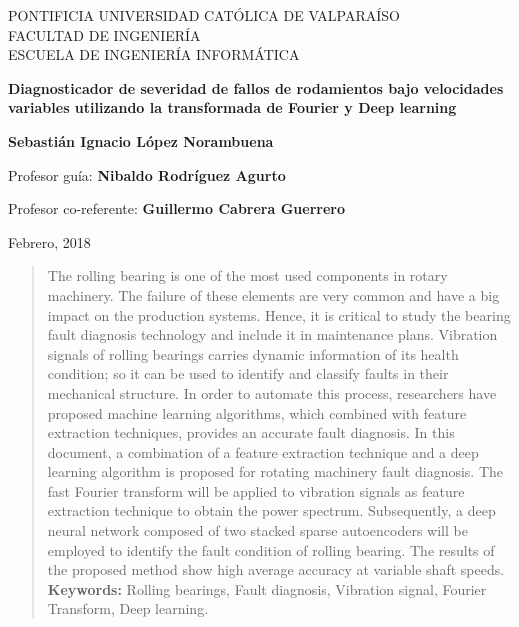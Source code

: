 \documentclass[12pt]{article}
\begin{document}
\thispagestyle{empty}

\begin{center}
PONTIFICIA UNIVERSIDAD CATÓLICA DE VALPARAÍSO\\
FACULTAD DE INGENIERÍA\\
ESCUELA DE INGENIERÍA INFORMÁTICA\\

\vspace{4cm}

\Large{\textbf{Diagnosticador de severidad de fallos de rodamientos bajo velocidades variables utilizando la transformada de Fourier y Deep learning}}

\vspace{3cm}

\normalsize{\textbf{Sebastián Ignacio López Norambuena}}\\
\end{center}

\vspace{3cm}
\begin{center} 
Profesor guía: \textbf{Nibaldo Rodríguez Agurto}
\end{center}
\begin{center} 
Profesor co-referente: \textbf{Guillermo Cabrera Guerrero}
\end{center}
\vspace{1cm}
\begin{center} 
Febrero, 2018
\end{center}
\newpage
{}


\begin{abstract}
\normalsize
\noindent The rolling bearing is one of the most used components in rotary machinery. The failure of these elements are very common and have a big impact on the production systems. Hence, it is critical to study the bearing fault diagnosis technology and include it in maintenance plans. Vibration signals of rolling bearings carries dynamic information of its health condition; so it can be used to identify and classify faults in their mechanical structure. In order to automate this process, researchers have proposed machine learning algorithms, which combined with feature extraction techniques, provides an accurate fault diagnosis. In this document, a combination of a feature extraction technique and a deep learning algorithm is proposed for rotating machinery fault diagnosis. The fast Fourier transform will be applied to vibration signals as feature extraction technique to obtain the power spectrum. Subsequently, a deep neural network composed of two stacked sparse autoencoders will be employed to identify the fault condition of rolling bearing. The results of the proposed method show high average accuracy at variable shaft speeds.
\newline
\newline
\textbf{Keywords:} Rolling bearings, Fault diagnosis, Vibration signal, Fourier Transform, Deep learning.
\end{abstract}
\end{document}
